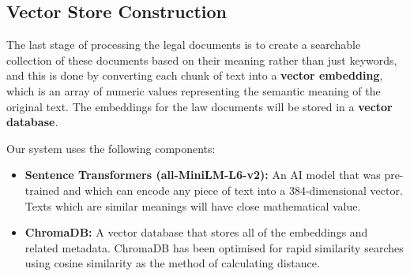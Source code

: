 \documentclass[12pt,a4paper]{article}
\begin{document}


\subsection{Vector Store Construction}
The last stage of processing the legal documents is to create a searchable collection of these documents based on their meaning rather than just keywords, and this is done by converting each chunk of text into a \textbf{vector embedding}, which is an array of numeric values representing the semantic meaning of the original text. The embeddings for the law documents will be stored in a \textbf{vector database}.






Our system uses the following components:

\begin{itemize}
  \item \textbf{Sentence Transformers (all-MiniLM-L6-v2):} An AI model that was pre-trained and which can encode any piece of text into a 384-dimensional vector. Texts which are similar meanings will have close mathematical value.
  \item \textbf{ChromaDB:} A vector database that stores all of the embeddings and related metadata. ChromaDB has been optimised for rapid similarity searches using cosine similarity as the method of calculating distance.
  
  
\end{itemize}
\end{document}
